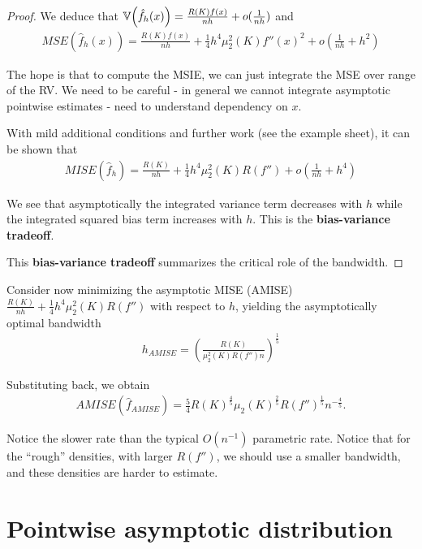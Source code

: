 \begin{proof}
  We deduce that $\Var{\hat f_{h}(x)} = \frac{R(K) f(x)}{nh} +
  o(\frac{1}{nh})$ and 
  \begin{align}
    \label{eq:22}
    MSE( \hat f_{h}(x)) = \frac{R(K) f(x)}{nh} + \frac{1}{4} h^{4}
    \mu_{2}^{2}(K) f''(x)^{2} + o(\frac{1}{nh} + h^{2})
  \end{align}

  The hope is that to compute the MSIE, we can just integrate the MSE
  over range of the RV.  We need to be careful - in general we cannot
  integrate asymptotic pointwise estimates - need to understand
  dependency on $x$.

  With mild additional conditions and further work (see the example
  sheet), it can be shown that
  \begin{align}
    \label{eq:23}
    MISE(\hat f_{h})= \frac{R(K)}{nh} + \frac{1}{4} h^{4}
    \mu_{2}^{2}(K)R(f'') + o(\frac{1}{nh} + h^{4})
  \end{align}

  We see that asymptotically the integrated variance term decreases with
  $h$ while the integrated squared bias term increases with $h$.  This
  is the \textbf{bias-variance tradeoff}.

  This \textbf{bias-variance tradeoff} summarizes the critical role of
  the bandwidth.
\end{proof}

Consider now minimizing the asymptotic MISE (AMISE) $\frac{R(K)}{nh} +
\frac{1}{4} h^{4} \mu_{2}^{2}(K) R(f'')$ with respect to $h$, yielding
the asymptotically optimal bandwidth
\begin{align}
  \label{eq:24}
  h_{AMISE} = (\frac{R(K)}{\mu_{2}^{2}(K) R(f'') n})^{\frac{1}{5}}
\end{align}

Substituting back, we obtain
\begin{align}
  \label{eq:25}
  AMISE(\hat f_{AMISE}) = \frac{5}{4} R(K)^{\frac{4}{5}}
  \mu_{2}(K)^{\frac{2}{5}} R(f'')^{\frac{1}{5}} n^{-\frac{4}{5}}.
\end{align}

Notice the slower rate than the typical $O(n^{-1})$
parametric rate.  Notice that for the ``rough'' densities, with larger
$R(f'')$, we should use a smaller bandwidth, and these densities are
harder to estimate.


\section{Pointwise asymptotic distribution}
\label{sec:pointw-asympt-distr}

